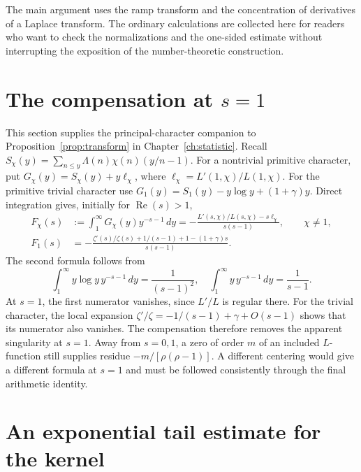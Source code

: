 \documentclass[11pt,openany,oneside]{scrbook}
\theoremstyle{definition}
\theoremstyle{remark}
\newcommand{\Rea}{\operatorname{Re}}
\begin{document}
The main argument uses the ramp transform and the concentration of derivatives of a Laplace transform.  The ordinary calculations are collected here for readers who want to check the normalizations and the one-sided estimate without interrupting the exposition of the number-theoretic construction.

\section{The compensation at \texorpdfstring{$s=1$}{s=1}}\label{app:mellin-normalization}

This section supplies the principal-character companion to Proposition~\ref{prop:transform} in Chapter~\ref{ch:statistic}. Recall $S_\chi(y)=\sum_{n\le y}\Lambda(n)\chi(n)(y/n-1)$.  For a nontrivial primitive character, put $G_\chi(y)=S_\chi(y)+y\ell_\chi$, where $\ell_\chi=L'(1,\chi)/L(1,\chi)$.  For the primitive trivial character use $G_1(y)=S_1(y)-y\log y+(1+\gamma)y$.  Direct integration gives, initially for $\Rea(s)>1$,
\begin{align*}
F_\chi(s)&:=\int_1^\infty G_\chi(y)y^{-s-1}\,dy
=-\frac{L'(s,\chi)/L(s,\chi)-s\ell_\chi}{s(s-1)},\qquad\chi\ne1,\\
F_1(s)&=-\frac{\zeta'(s)/\zeta(s)+1/(s-1)+1-(1+\gamma)s}{s(s-1)}.
\end{align*}
The second formula follows from
\[
\int_1^\infty y\log y\,y^{-s-1}\,dy=\frac1{(s-1)^2},
\quad\int_1^\infty y\,y^{-s-1}\,dy=\frac1{s-1}.
\]
At $s=1$, the first numerator vanishes, since $L'/L$ is regular there.  For the trivial character, the local expansion $\zeta'/\zeta=-1/(s-1)+\gamma+O(s-1)$ shows that its numerator also vanishes.  The compensation therefore removes the apparent singularity at $s=1$.  Away from $s=0,1$, a zero of order $m$ of an included $L$-function still supplies residue $-m/[\rho(\rho-1)]$.  A different centering would give a different formula at $s=1$ and must be followed consistently through the final arithmetic identity.

\section{An exponential tail estimate for the kernel}\label{app:kernel}
\end{document}
